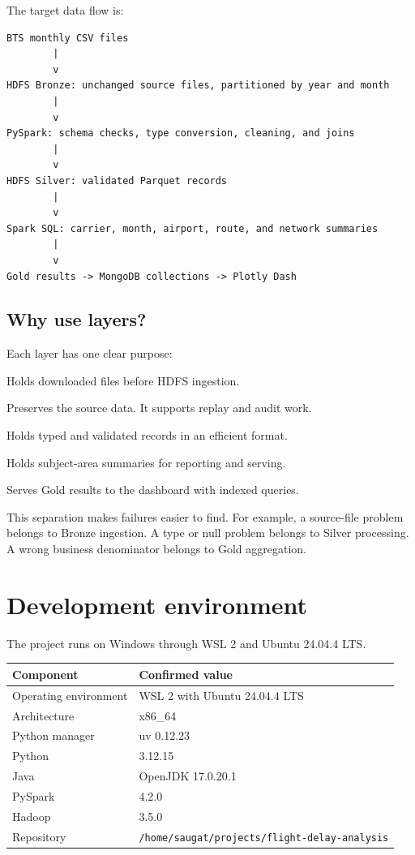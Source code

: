 \documentclass[11pt,a4paper]{article}
\begin{document}
The target data flow is:

\begin{lstlisting}
BTS monthly CSV files
        |
        v
HDFS Bronze: unchanged source files, partitioned by year and month
        |
        v
PySpark: schema checks, type conversion, cleaning, and joins
        |
        v
HDFS Silver: validated Parquet records
        |
        v
Spark SQL: carrier, month, airport, route, and network summaries
        |
        v
Gold results -> MongoDB collections -> Plotly Dash
\end{lstlisting}

\subsection{Why use layers?}

Each layer has one clear purpose:

\begin{description}[leftmargin=3.2cm,style=nextline]
  \item[Landing] Holds downloaded files before HDFS ingestion.
  \item[Bronze] Preserves the source data. It supports replay and audit work.
  \item[Silver] Holds typed and validated records in an efficient format.
  \item[Gold] Holds subject-area summaries for reporting and serving.
  \item[MongoDB] Serves Gold results to the dashboard with indexed queries.
\end{description}

This separation makes failures easier to find. For example, a source-file problem belongs to Bronze ingestion. A type or null problem belongs to Silver processing. A wrong business denominator belongs to Gold aggregation.

\section{Development environment}

The project runs on Windows through WSL 2 and Ubuntu 24.04.4 LTS.

\begin{center}
\begin{tabularx}{\textwidth}{@{}lX@{}}
\toprule
Component & Confirmed value \\
\midrule
Operating environment & WSL 2 with Ubuntu 24.04.4 LTS \\
Architecture & x86\_64 \\
Python manager & uv 0.12.23 \\
Python & 3.12.15 \\
Java & OpenJDK 17.0.20.1 \\
PySpark & 4.2.0 \\
Hadoop & 3.5.0 \\
Repository & \texttt{/home/saugat/projects/flight-delay-analysis} \\
\bottomrule
\end{tabularx}
\end{center}
\end{document}
